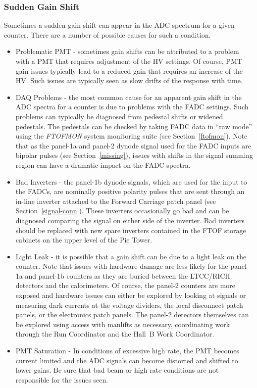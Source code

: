 \documentclass[12pt]{article}
\begin{document}
\subsubsection{Sudden Gain Shift}
\label{gain-shift}

Sometimes a sudden gain shift can appear in the ADC spectrum for a given counter. There 
are a number of possible causes for such a condition.

\begin{itemize}
\item Problematic PMT - sometimes gain shifts can be attributed to a problem with a PMT 
that requires adjustment of the HV settings. Of course, PMT gain issues typically lead 
to a reduced gain that requires an increase of the HV. Such issues are typically seen 
as slow drifts of the response with time.
\item DAQ Problems - the most common cause for an apparent gain shift in the ADC spectra 
for a counter is due to problems with the FADC settings. Such problems can typically be 
diagnosed from pedestal shifts or widened pedestals. The pedestals can be checked by 
taking FADC data in ``raw mode'' using the {\it FTOFMON} system monitoring suite (see 
Section~\ref{ftofmon}). Note that as the panel-1a and panel-2 dynode signal used for the 
FADC inputs are bipolar pulses (see Section~\ref{missing}), issues with shifts in the 
signal summing region can have a dramatic impact on the FADC spectra. 
\item Bad Inverters - the panel-1b dynode signals, which are used for the input to the 
FADCs, are nominally positive polarity pulses that are sent through an in-line inverter 
attached to the Forward Carriage patch panel (see Section~\ref{signal-conn}). These 
inverters occasionally go bad and can be diagnosed comparing the signal on either side 
of the inverter. Bad inverters should be replaced with new spare inverters contained in 
the FTOF storage cabinets on the upper level of the Pie Tower.
\item Light Leak - it is possible that a gain shift can be due to a light leak on the 
counter. Note that issues with hardware damage are less likely for the panel-1a and 
panel-1b counters as they are buried between the LTCC/RICH detectors and the 
calorimeters. Of course, the panel-2 counters are more exposed and hardware issues can 
either be explored by looking at signals or measuring dark currents at the voltage 
dividers, the local disconnect patch panels, or the electronics patch panels. The 
panel-2 detectors themselves can be explored using access with manlifts as necessary, 
coordinating work through the Run Coordinator and the Hall~B Work Coordinator.
\item PMT Saturation - In conditions of excessive high rate, the PMT becomes current 
limited and the ADC signals can become distorted and shifted to lower gains. Be sure 
that bad beam or high rate conditions are not responsible for the issues seen.
\end{itemize}
\end{document}
